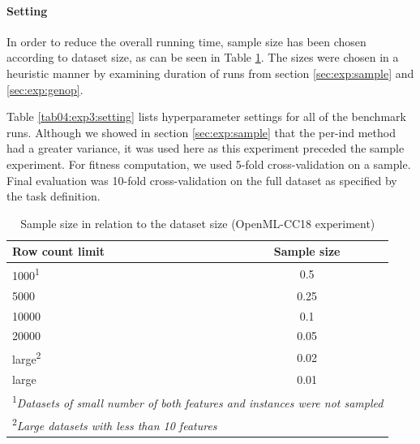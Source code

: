 \paragraph{Setting}
In order to reduce the overall running time, sample size has been chosen
according to dataset size, as can be seen in Table \ref{tab04:exp3:size}.
The sizes were chosen in a heuristic manner by examining duration of runs
from section \ref{sec:exp:sample} and \ref{sec:exp:genop}.

Table \ref{tab04:exp3:setting} lists hyperparameter settings for all of the
benchmark runs. Although we showed in section \ref{sec:exp:sample}
that the per-ind method had a greater variance, it was used here as this
experiment preceded the sample experiment. For fitness computation, we used
5-fold cross-validation on a sample. Final evaluation was 10-fold
cross-validation on the full dataset as specified by the task definition.

\begin{table}[b]

\centering
\caption{Sample size in relation to the dataset size (OpenML-CC18 experiment)}\label{tab04:exp3:size}
\begin{tabular}{l c}
\toprule
\textbf{Row count limit} & \textbf{Sample size} \\
\midrule
1000\textsuperscript{1} & 0.5 \\
5000 & 0.25 \\
10000 & 0.1 \\
20000 & 0.05 \\
large\textsuperscript{2} & 0.02 \\
large & 0.01 \\
\bottomrule

\multicolumn{2}{l}{\footnotesize
\textsuperscript{1}\textit{Datasets of small number of both features and
instances were not sampled}} \\
\multicolumn{2}{l}{\footnotesize
\textsuperscript{2}\textit{Large datasets with less than 10 features}} 

\end{tabular}

\end{table}

